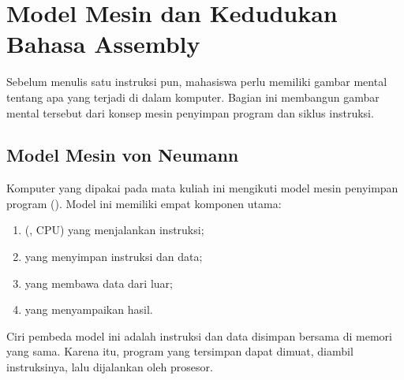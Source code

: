 \section{Model Mesin dan Kedudukan Bahasa Assembly}
\label{sec:model-mesin}

Sebelum menulis satu instruksi pun, mahasiswa perlu memiliki gambar
mental tentang apa yang terjadi di dalam komputer. Bagian ini
membangun gambar mental tersebut dari konsep mesin penyimpan program
dan siklus instruksi.

\subsection{Model Mesin von Neumann}

Komputer yang dipakai pada mata kuliah ini mengikuti model mesin
penyimpan program (). Model ini memiliki empat
komponen utama:

\begin{enumerate}
    \item {} (, CPU)
          yang menjalankan instruksi;
    \item {} yang menyimpan instruksi dan data;
    \item {} yang membawa data dari luar;
    \item {} yang menyampaikan hasil.
\end{enumerate}

Ciri pembeda model ini adalah instruksi dan data disimpan bersama di
memori yang sama. Karena itu, program yang tersimpan dapat dimuat,
diambil instruksinya, lalu dijalankan oleh prosesor.

